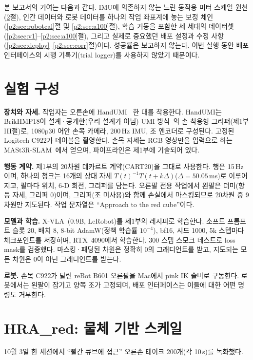 \documentclass[conference,10pt]{IEEEtran}
\begin{document}
본 보고서의 기여는 다음과 같다. IMU에 의존하지 않는 느린 동작용 미터 스케일 원천(\ref{p2:sec:scale}절), 인간 데이터와 로봇
데이터를 하나의 작업 좌표계에 놓는 보정 체인(\ref{p2:sec:robotcal}절 및 \ref{p2:sec:a100}절), 학습 거동을 포함한 세 세대의
데이터셋(\ref{p2:sec:v1}--\ref{p2:sec:a100}절), 그리고 실제로 중요했던 배포 설정과 수정 사항(\ref{p2:sec:deploy}--\ref{p2:sec:corr}절)이다.
성공률은 보고하지 않는다. 이번 실행 동안 배포 인터페이스의 시행 기록기(trial logger)를 사용하지 않았기 때문이다.

\section{실험 구성}\label{p2:sec:setup}
\textbf{장치와 자세.} 작업자는 오른손에 HandUMI~\cite{handumi_hw} 한 대를 착용한다. HandUMI는 BrikHMP18이 설계·공개한(우리 설계가 아님) UMI 방식~\cite{chi2024umi}의 손 착용형
그리퍼(제1부 III절)로, 1080p30 어안 손목 카메라, 200\,Hz IMU, 조 엔코더로 구성된다. 고정된 Logitech C922가 테이블을
촬영한다. 손목 자세는 RGB 영상만을 입력으로 하는 MASt3R-SLAM~\cite{murai2025mast3rslam}에서 얻으며, 파이프라인은
제1부에 기술되어 있다.

\textbf{행동 계약.} 제1부의 20차원 데카르트 계약(CART20)을 그대로 사용한다. 행은 15\,Hz이며, 하나의 청크는 16개의 상대
자세 $T(t)^{-1}T(t+k\Delta)$($\Delta=50.05$\,ms)로 이루어지고, 팔마다 위치, 6-D 회전, 그리퍼를 담는다. 오른팔 전용
작업에서 왼팔은 더미(항등 자세, 그리퍼 0)이며, 그리퍼(조 미사용)와 함께 손실에서 마스킹되므로 20차원 중 9차원만
지도된다. 작업 문자열은 ``Approach to the red cube''이다.

\textbf{모델과 학습.} X-VLA~\cite{zheng2025xvla}(0.9B, LeRobot)를 제1부의 레시피로 학습한다. 소프트 프롬프트 슬롯 20,
배치 8, 8-bit AdamW(정책 학습률 $10^{-4}$), bf16, 시드 1000, 5k 스텝마다 체크포인트를 저장하며, RTX~4090에서 학습한다.
300 스텝 스모크 테스트로 loss mask를 검증했다. 마스킹·패딩된 차원은 정확히 0의 그래디언트를 받고, 지도되는 모든 차원은
0이 아닌 그래디언트를 받는다.

\textbf{로봇.} 손목 C922가 달린 reBot B601 오른팔을 Mac에서 pink IK 솔버로 구동한다. 로봇에서는 왼팔이 잠기고 양쪽 조가
고정되며, 배포 인터페이스는 이들에 대한 어떤 명령도 거부한다.

\section{HRA\_red: 물체 기반 스케일}\label{p2:sec:scale}
10월 3일 한 세션에서 ``빨간 큐브에 접근'' 오른손 테이크 200개(각 10\,s)를 녹화했다.
\end{document}
